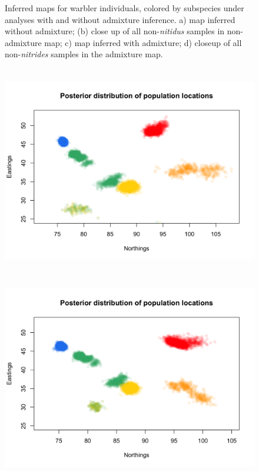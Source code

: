 \documentclass[12pt]{article}
\begin{document}
\begin{figure}
	\caption{
    Inferred maps for warbler individuals, colored by subspecies under analyses with and without admixture inference. a) map inferred without admixture; (b) close up of all non-\textit{nitidus} samples in non-admixture map; c) map inferred with admixture; d) closeup of all non-\textit{nitrides} samples in the admixture map.}\label{sfig:warbler_ind_maps_compare}
\end{figure}

\begin{figure}
	\centering
			{\includegraphics[width=5in,height=3.6in]{figs/warblers/warb_inds_ad_post_map_randpr2.png}}
			{\includegraphics[width=5in,height=3.6in]{figs/warblers/warb_inds_ad_post_map_realpr1.png}}

\end{figure}
\end{document}
